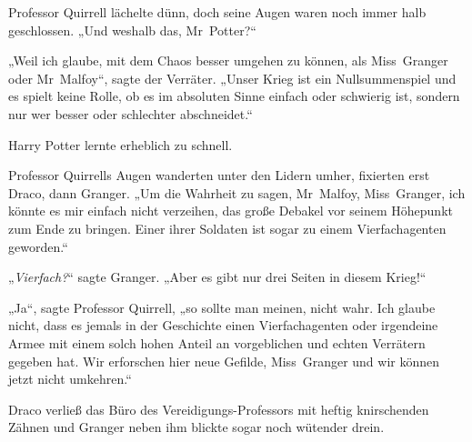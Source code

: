 Professor Quirrell lächelte dünn, doch seine Augen waren noch immer halb geschlossen. „Und weshalb das, Mr~Potter?“

„Weil ich glaube, mit dem Chaos besser umgehen zu können, als Miss~Granger oder Mr~Malfoy“, sagte der Verräter. „Unser Krieg ist ein Nullsummenspiel und es spielt keine Rolle, ob es im absoluten Sinne einfach oder schwierig ist, sondern nur wer besser oder schlechter abschneidet.“

Harry Potter lernte erheblich zu schnell.

Professor Quirrells Augen wanderten unter den Lidern umher, fixierten erst Draco, dann Granger. „Um die Wahrheit zu sagen, Mr~Malfoy, Miss~Granger, ich könnte es mir einfach nicht verzeihen, das große Debakel vor seinem Höhepunkt zum Ende zu bringen. Einer ihrer Soldaten ist sogar zu einem Vierfachagenten geworden.“

„\emph{Vierfach?}“ sagte Granger. „Aber es gibt nur drei Seiten in diesem Krieg!“

„Ja“, sagte Professor Quirrell, „so sollte man meinen, nicht wahr. Ich glaube nicht, dass es jemals in der Geschichte einen Vierfachagenten oder irgendeine Armee mit einem solch hohen Anteil an vorgeblichen und echten Verrätern gegeben hat. Wir erforschen hier neue Gefilde, Miss~Granger und wir können jetzt nicht umkehren.“

Draco verließ das Büro des Vereidigungs-Professors mit heftig knirschenden Zähnen und Granger neben ihm blickte sogar noch wütender drein.

